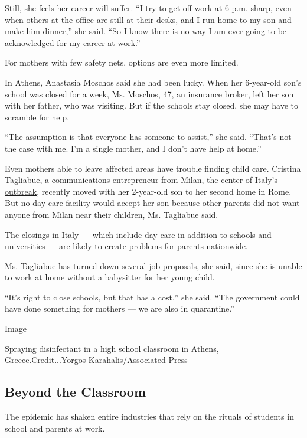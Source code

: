 Still, she feels her career will suffer. ``I try to get off work at 6
p.m. sharp, even when others at the office are still at their desks, and
I run home to my son and make him dinner,'' she said. ``So I know there
is no way I am ever going to be acknowledged for my career at work.''

For mothers with few safety nets, options are even more limited.

In Athens, Anastasia Moschos said she had been lucky. When her
6-year-old son's school was closed for a week, Ms. Moschos, 47, an
insurance broker, left her son with her father, who was visiting. But if
the schools stay closed, she may have to scramble for help.

``The assumption is that everyone has someone to assist,'' she said.
``That's not the case with me. I'm a single mother, and I don't have
help at home.''

Even mothers able to leave affected areas have trouble finding child
care. Cristina Tagliabue, a communications entrepreneur from Milan,
\href{https://www.nytimes3xbfgragh.onion/2020/02/24/world/europe/24coronavirus-milan-italy.html?action=click\&module=RelatedLinks\&pgtype=Article}{the
center of Italy's outbreak}, recently moved with her 2-year-old son to
her second home in Rome. But no day care facility would accept her son
because other parents did not want anyone from Milan near their
children, Ms. Tagliabue said.

The closings in Italy --- which include day care in addition to schools
and universities --- are likely to create problems for parents
nationwide.

Ms. Tagliabue has turned down several job proposals, she said, since she
is unable to work at home without a babysitter for her young child.

``It's right to close schools, but that has a cost,'' she said. ``The
government could have done something for mothers --- we are also in
quarantine.''

Image

Spraying disinfectant in a high school classroom in Athens,
Greece.Credit...Yorgos Karahalis/Associated Press

\hypertarget{beyond-the-classroom}{%
\subsection{Beyond the Classroom}\label{beyond-the-classroom}}

The epidemic has shaken entire industries that rely on the rituals of
students in school and parents at work.

